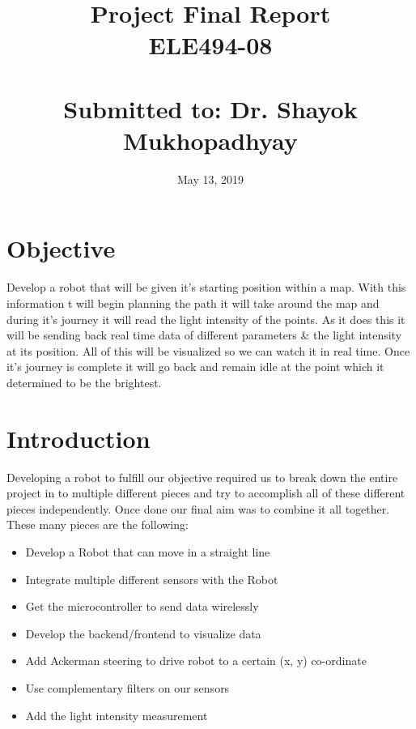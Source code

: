 \documentclass[conference]{IEEEtran}
\date{May 13, 2019}
\makeatletter
\let\thedate\@date
\makeatother
\begin{document}
 
    \title{
        Project Final Report\\[0.2cm]
        \large ELE494-08\\
        \large \thedate\\
        Submitted to: Dr. Shayok Mukhopadhyay
    }

    \author{
        \and

    }

    \maketitle

    \section{Objective}

    Develop a robot that will be given it's starting position within a map.
    With this information t will begin planning the path it will take around the map and during it's journey it
    will read the light intensity of the points. As it does this it will be sending back real time data of
    different parameters \& the light intensity at its position. All of this will be visualized so we can watch
    it in real time. Once it's journey is complete it will go back and remain idle at the point which it determined
    to be the brightest.

    \section{Introduction}
    
    Developing a robot to fulfill our objective required us to break down the entire 
    project in to multiple different pieces and try to accomplish all of these different pieces
    independently. Once done our final aim was to combine it all together. These many pieces are
    the following:

    \begin{itemize}
        \item Develop a Robot that can move in a straight line
        \item Integrate multiple different sensors with the Robot
        \item Get the microcontroller to send data wirelessly
        \item Develop the backend/frontend to visualize data
        \item Add Ackerman steering to drive robot to a certain (x, y) co-ordinate
        \item Use complementary filters on our sensors
        \item Add the light intensity measurement\\
    \end{itemize}
\end{document}
